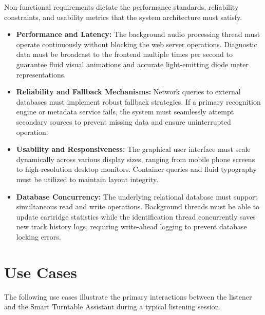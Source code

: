 \documentclass[12pt,a4paper,english]{report}
\begin{document}
Non-functional requirements dictate the performance standards, reliability constraints, and usability metrics that the system architecture must satisfy.

\begin{itemize}
    \item \textbf{Performance and Latency:} The background audio processing thread must operate continuously without blocking the web server operations. Diagnostic data must be broadcast to the frontend multiple times per second to guarantee fluid visual animations and accurate light-emitting diode meter representations.
    \item \textbf{Reliability and Fallback Mechanisms:} Network queries to external databases must implement robust fallback strategies. If a primary recognition engine or metadata service fails, the system must seamlessly attempt secondary sources to prevent missing data and ensure uninterrupted operation.
    \item \textbf{Usability and Responsiveness:} The graphical user interface must scale dynamically across various display sizes, ranging from mobile phone screens to high-resolution desktop monitors. Container queries and fluid typography must be utilized to maintain layout integrity.
    \item \textbf{Database Concurrency:} The underlying relational database must support simultaneous read and write operations. Background threads must be able to update cartridge statistics while the identification thread concurrently saves new track history logs, requiring write-ahead logging to prevent database locking errors.
\end{itemize}

\section{Use Cases}

The following use cases illustrate the primary interactions between the listener and the Smart Turntable Assistant during a typical listening session.
\end{document}
